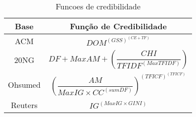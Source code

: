 \begin{table}
\renewcommand{\arraystretch}{1.3}
\centering
\begin{scriptsize}
\begin{tabular}{|c|c|}
\toprule
\textbf{Base} & \textbf{Função de Credibilidade}\tabularnewline
\midrule
ACM   & $ DOM^{(GSS)^{(CE + TF)}} $\tabularnewline
\hline 
20NG & $ DF + MaxAM + (\dfrac{ CHI } { TFIDF^{(MaxTFIDF)} }) $\tabularnewline
\hline 
Ohsumed  & $(\dfrac{AM}{MaxIG \times CC^{(sumDF)}} )^{(TFICF)^{(TFICF)}} $\tabularnewline
\hline 
Reuters & $IG^{(MaxIG \times GINI)}$\tabularnewline
\bottomrule
\end{tabular}
\caption{Funcoes de credibilidade}
\label{tab::}
\end{scriptsize}
\end{table}





